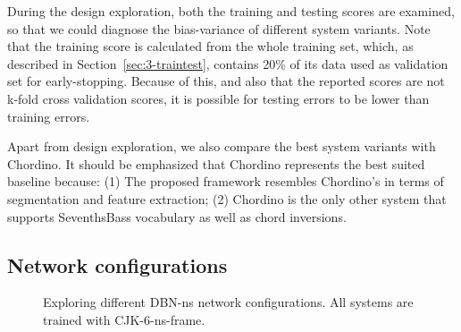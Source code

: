 During the design exploration, both the training and testing scores are examined, so that we could diagnose the bias-variance of different system variants. Note that the training score is calculated from the whole training set, which, as described in Section~\ref{sec:3-traintest}, contains 20\% of its data used as validation set for early-stopping. Because of this, and also that the reported scores are not k-fold cross validation scores, it is possible for testing errors to be lower than training errors.

Apart from design exploration, we also compare the best system variants with Chordino. It should be emphasized that Chordino represents the best suited baseline because: (1) The proposed framework resembles Chordino's in terms of segmentation and feature extraction; (2) Chordino is the only other system that supports SeventhsBass vocabulary as well as chord inversions.

\subsection{Network configurations} \label{sec:3-p2}

\begin{figure}[htb]
	\centering
	\caption{Exploring different DBN-ns network configurations. All systems are trained with CJK-6-ns-frame.}
	\label{fig:3-dbn-ns-configs}
\end{figure}

